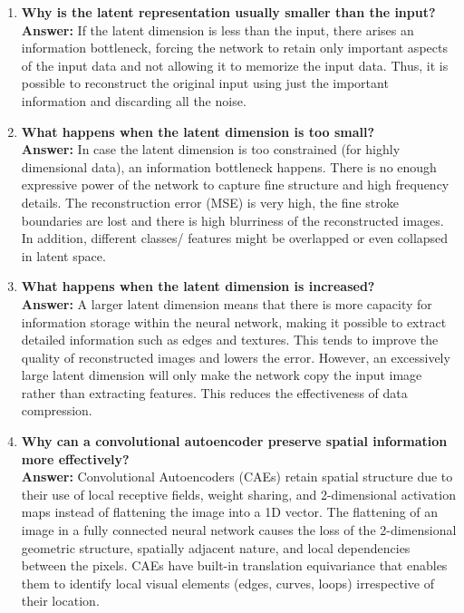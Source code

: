 \documentclass[10pt]{article}
\begin{document}
\begin{enumerate}
\vspace{5mm}

\item \textbf{Why is the latent representation usually smaller than the input?}\\[1.5mm]
\textbf{Answer:} If the latent dimension is less than the input, there arises an information bottleneck, forcing the network to retain only important aspects of the input data and not allowing it to memorize the input data.
 Thus, it is possible to reconstruct the original input using just the important information and discarding all the noise.

\vspace{5mm}

\item \textbf{What happens when the latent dimension is too small?}\\[1.5mm]
\textbf{Answer:} In case the latent dimension is too constrained (for highly dimensional data), an information bottleneck happens. There is no enough expressive power of the network to capture fine structure and high frequency details. The reconstruction error (MSE) is very high, the fine stroke boundaries are lost and there is high blurriness of the reconstructed images. In addition, different classes/ features might be overlapped or even collapsed in latent space.

\vspace{5mm}

\item \textbf{What happens when the latent dimension is increased?}\\[1.5mm]
\textbf{Answer:} A larger latent dimension means that there is more capacity for information storage within the neural network, making it possible to extract detailed information such as edges and textures. This tends to improve the quality of reconstructed images and lowers the error. However, an excessively large latent dimension will only make the network copy the input image rather than extracting features. This reduces the effectiveness of data compression.

\vspace{5mm}

\item \textbf{Why can a convolutional autoencoder preserve spatial information more effectively?}\\[1.5mm]
\textbf{Answer:} Convolutional Autoencoders (CAEs) retain spatial structure due to their use of local receptive fields, weight sharing, and 2-dimensional activation maps instead of flattening the image into a 1D vector. The flattening of an image in a fully connected neural network causes the loss of the 2-dimensional geometric structure, spatially adjacent nature, and local dependencies between the pixels. CAEs have built-in translation equivariance that enables them to identify local visual elements (edges, curves, loops) irrespective of their location.


\end{enumerate}
\end{document}
